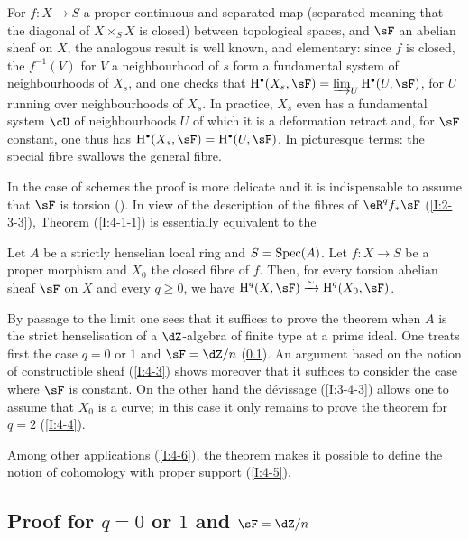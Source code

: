 For $f:X\to S$ a proper continuous and separated map (separated
meaning that the diagonal of $X\times_S X$ is closed) between
topological spaces, and $\sF$ an abelian sheaf on $X$, the analogous result is
well known, and elementary: since $f$ is closed, the $f^{-1}(V)$ for
$V$ a neighbourhood of $s$ form a fundamental system of neighbourhoods of $X_s$, and
one checks that $\h^\bullet(X_s,\sF) = \varinjlim_U \h^\bullet(U,\sF)$, for $U$ running over
neighbourhoods of $X_s$. In practice, $X_s$ even has a fundamental system
$\cU$ of neighbourhoods $U$ of which it is a deformation retract and, for $\sF$
constant, one thus has $\h^\bullet(X_s,\sF)=\h^\bullet(U,\sF)$. In picturesque terms: the
special fibre swallows the general fibre.

In the case of schemes the proof is more delicate and it is
indispensable to assume that $\sF$ is torsion (\cite[XII.2]{sga4}). In view
of the description of the fibres of $\eR^q f_* \sF$ (\ref{I:2-3-3}), Theorem
(\ref{I:4-1-1}) is essentially equivalent to the 

 
  
   
    
\begin{theorem}\label{I:4-1-2}
Let $A$ be a strictly henselian local ring and $S=\operatorname{Spec}(A)$. Let
$f:X\to S$ be a proper morphism and $X_0$ the closed fibre of $f$. Then, for
every torsion abelian sheaf $\sF$ on $X$ and every $q\geqslant 0$, we
have $\h^q(X,\sF) \iso \h^q(X_0,\sF)$.
\end{theorem}

By passage to the limit one sees that it suffices to prove the theorem
when $A$ is the strict henselisation of a $\dZ$-algebra of finite type at
a prime ideal. One treats first the case $q=0$ or $1$ and $\sF=\dZ/n$
(\ref{I:4-2}). An argument based on the notion of constructible sheaf
(\ref{I:4-3}) shows moreover that it suffices to consider the case where $\sF$ is
constant. On the other hand the d\'evissage (\ref{I:3-4-3}) allows one to assume that
$X_0$ is a curve; in this case it only remains to prove the
theorem for $q=2$ (\ref{I:4-4}).

Among other applications (\ref{I:4-6}), the theorem makes it possible to define the
notion of cohomology with proper support (\ref{I:4-5}). 










\subsection{Proof for \texorpdfstring{$q=0$}{q=1} or \texorpdfstring{$1$}{1} and \texorpdfstring{$\sF=\dZ/n$}{\sF=Z/n}}\label{I:4-2}

